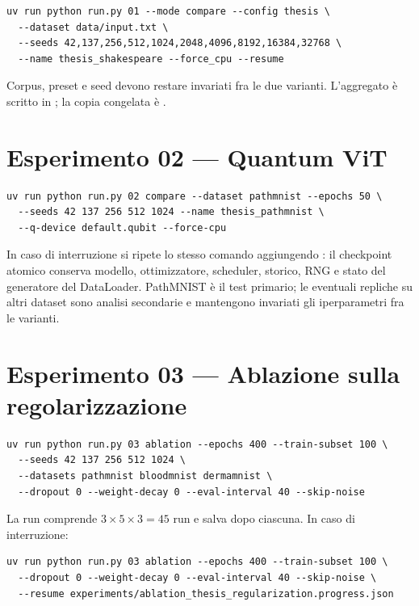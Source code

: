 \begin{lstlisting}[style=shell, numbers=none]
uv run python run.py 01 --mode compare --config thesis \
  --dataset data/input.txt \
  --seeds 42,137,256,512,1024,2048,4096,8192,16384,32768 \
  --name thesis_shakespeare --force_cpu --resume
\end{lstlisting}

Corpus, preset e seed devono restare invariati fra le due varianti. L'aggregato
è scritto in ; la copia
congelata è .

\section{Esperimento 02 --- Quantum ViT}

\begin{lstlisting}[style=shell, numbers=none]
uv run python run.py 02 compare --dataset pathmnist --epochs 50 \
  --seeds 42 137 256 512 1024 --name thesis_pathmnist \
  --q-device default.qubit --force-cpu
\end{lstlisting}

In caso di interruzione si ripete lo stesso comando aggiungendo :
il checkpoint atomico conserva modello, ottimizzatore, scheduler, storico, RNG e
stato del generatore del DataLoader. PathMNIST è il test primario; le eventuali
repliche su altri dataset sono analisi secondarie e mantengono invariati gli
iperparametri fra le varianti.

\section{Esperimento 03 --- Ablazione sulla regolarizzazione}

\begin{lstlisting}[style=shell, numbers=none]
uv run python run.py 03 ablation --epochs 400 --train-subset 100 \
  --seeds 42 137 256 512 1024 \
  --datasets pathmnist bloodmnist dermamnist \
  --dropout 0 --weight-decay 0 --eval-interval 40 --skip-noise
\end{lstlisting}

La run comprende $3 \times 5 \times 3 = 45$ run e salva
\file{ablation\_progress.json} dopo ciascuna. In caso di interruzione:

\begin{lstlisting}[style=shell, numbers=none]
uv run python run.py 03 ablation --epochs 400 --train-subset 100 \
  --dropout 0 --weight-decay 0 --eval-interval 40 --skip-noise \
  --resume experiments/ablation_thesis_regularization.progress.json
\end{lstlisting}

